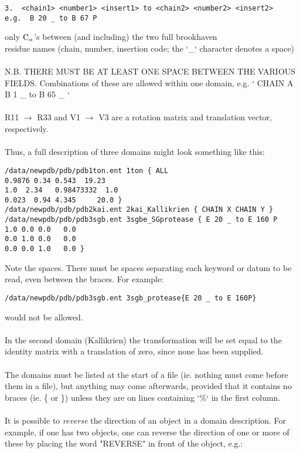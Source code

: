 \begin{scriptsize}\begin{verbatim}
3.  <chain1> <number1> <insert1> to <chain2> <number2> <insert2>
e.g.  B 20 _ to B 67 P 
\end{verbatim} \end{scriptsize}
only ${\rm C}_{\alpha}$'s between (and including) the two full brookhaven\\
residue names (chain, number, insertion code;
the `\_` character denotes a space)\\
\\
N.B. THERE MUST BE AT LEAST ONE SPACE BETWEEN THE VARIOUS FIELDS.
Combinations of these are allowed within one domain, e.g. `{ CHAIN A B 1 
\_ to B 65 \_ }`\\
\\
R11 $\rightarrow$ R33 and V1 $\rightarrow$ V3 are a rotation matrix and translation vector, respectively.\\
\\
Thus, a full description of three domains might look something
like this:\\

\begin{scriptsize}\begin{verbatim}
/data/newpdb/pdb/pdb1ton.ent 1ton { ALL 
0.9876 0.34 0.543  19.23
1.0  2.34   0.98473332  1.0
0.023  0.94 4.345     20.0 }
/data/newpdb/pdb/pdb2kai.ent 2kai_Kallikrien { CHAIN X CHAIN Y }
/data/newpdb/pdb/pdb3sgb.ent 3sgbe_SGprotease { E 20 _ to E 160 P 
1.0 0.0 0.0   0.0
0.0 1.0 0.0   0.0
0.0 0.0 1.0   0.0 }
\end{verbatim} \end{scriptsize}

Note the spaces.  There must be spaces separating each keyword or 
datum to be read, even between the braces.  For example:

\begin{scriptsize}
\begin{verbatim}
/data/newpdb/pdb/pdb3sgb.ent 3sgb_protease{E 20 _ to E 160P}
\end{verbatim}\end{scriptsize}

would not be allowed.\\
\\
In the second domain (Kallikrien) the transformation will be set equal
to the identity matrix with a translation of zero, since none has been 
supplied.\\
\\
The domains must be listed at the start of a file (ie. nothing must
come before them in a file), but anything may come afterwards, 
provided that it contains no braces (ie. \{ or \}) unless they are on lines 
containing `\%` in the first column.\\
\\
It is possible to {\em reverse} the direction of an object in a domain
description.  For example, if one has two objects,
one can reverse the direction of one or more of these by placing the
word "REVERSE" in front of the object, e.g.:

